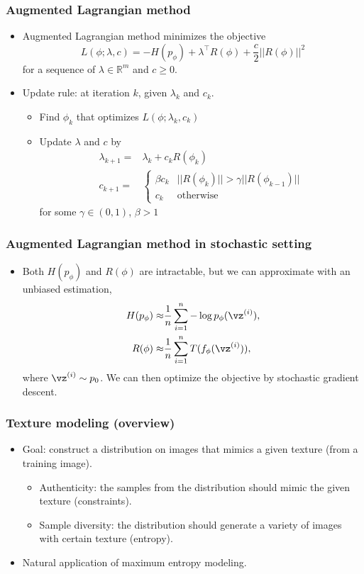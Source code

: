 \documentclass[16pt,presentation]{beamer}
\begin{document}
\begin{frame}
\frametitle{Augmented Lagrangian method}
\begin{itemize}
\item Augmented Lagrangian method minimizes the objective
\[L(\phi; \lambda, c) = - H(p_\phi) + \lambda^{\top} R(\phi) + \dfrac{c}{2}||R(\phi)||^2\]
for a sequence of $\lambda \in \mathbb{R}^m$ and $c \geq 0$.
\item Update rule: at iteration $k$, given $\lambda_k$ and $c_k$.
\begin{itemize}
\item Find $\phi_k$ that optimizes $L(\phi; \lambda_k, c_k)$
\item Update $\lambda$ and $c$ by
\[\begin{split}
\lambda_{k+1} =& \lambda_k + c_k R(\phi_k)\\
c_{k+1} =&\begin{cases}
\beta c_{k} & ||R(\phi_{k})||>\gamma ||R(\phi_{k-1})|| \\
c_k & \text{otherwise}
\end{cases}
\end{split}\]
for some $\gamma \in (0,1)$, $\beta > 1$
\end{itemize}
\end{itemize}
\end{frame}

\begin{frame}
\frametitle{Augmented Lagrangian method in stochastic setting}
\begin{itemize}
\item Both $H(p_\phi)$ and $R(\phi)$ are intractable, but we can approximate with an unbiased estimation,
\[\begin{split}
H(p_\phi) \approx& \frac{1}{n} \sum_{i=1}^n -\log p_\phi(\vz^{(i)}),\\
R(\phi) \approx& \frac{1}{n} \sum_{i=1}^nT(f_\phi( \vz^{(i)})),
\end{split}\]
where $\vz^{(i)} \sim p_0$. We can then optimize the objective by stochastic gradient descent.
\end{itemize}
\end{frame}

\begin{frame}
\frametitle{Texture modeling (overview)}
\begin{itemize}
\item Goal: construct a distribution on images that mimics a given texture (from a training image).
\begin{itemize}
\item Authenticity: the samples from the distribution should mimic the given texture (constraints).
\item Sample diversity: the distribution should generate a variety of images with certain texture (entropy).
\end{itemize}
\item Natural application of maximum entropy modeling.
\end{itemize}
\end{frame}
\end{document}

